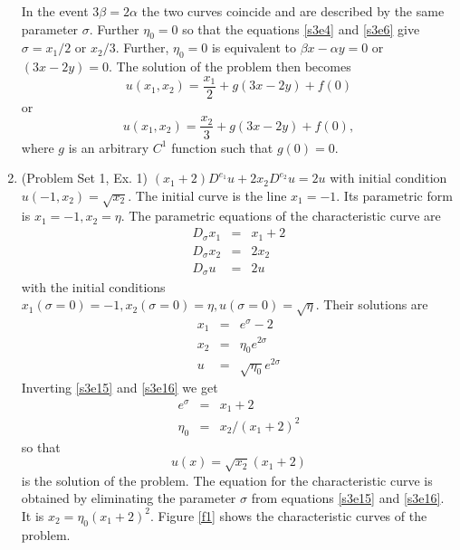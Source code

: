 \documentclass{article}
\theoremstyle{plain}
\numberwithin{thm}{section}
\theoremstyle{plain}
\numberwithin{prop}{section}
\theoremstyle{definition}
\numberwithin{defn}{section}
\theoremstyle{remark}
\numberwithin{equation}{section}
\begin{document}
\begin{enumerate}
In the event $3\beta = 2\alpha$ the two curves coincide and are described by the same parameter 
$\sigma$. Further $\eta_0 = 0$ so that the equations \eqref{s3e4} and \eqref{s3e6} give $\sigma = 
x_1/2$ or $x_2/3$. Further, $\eta_0 = 0$ is equivalent to $\beta x - \alpha y = 0$ or $(3x - 2y) = 0$.
The solution of the problem then becomes
\begin{equation}\label{s3e10}
u(x_1, x_2) = \frac{x_1}{2} + g(3x - 2y) + f(0)
\end{equation}
or
\begin{equation}\label{s3e11}
u(x_1, x_2) = \frac{x_2}{3} + g(3x - 2y) + f(0),
\end{equation}
where $g$ is an arbitrary $C^1$ function such that $g(0) = 0$.

\item (Problem Set 1, Ex. 1) $(x_1 + 2)D^{e_1}u + 2x_2D^{e_2}u = 2u$ with initial condition 
$u(-1, x_2) = \sqrt{x_2}$. The initial curve is the line $x_1 = -1$. Its parametric form is $x_1 = -1,
x_2 = \eta$. The parametric equations of the characteristic curve are
\begin{eqnarray}
D_\sigma x_1 &=& x_1 + 2 \label{s3e12} \\
D_\sigma x_2 &=& 2x_2 \label{s3e13} \\
D_\sigma u &=& 2u \label{s3e14}
\end{eqnarray}
with the initial conditions $x_1(\sigma = 0) = -1, x_2(\sigma = 0) = \eta, u(\sigma = 0) = 
\sqrt{\eta}$. Their solutions are
\begin{eqnarray}
x_1 &=& e^\sigma - 2 \label{s3e15} \\ 
x_2 &=& \eta_0 e^{2\sigma} \label{s3e16} \\
u &=& \sqrt{\eta_0}e^{2\sigma} \label{s3e17}
\end{eqnarray}
Inverting \eqref{s3e15} and \eqref{s3e16} we get 
\begin{eqnarray}
e^\sigma &=& x_1 + 2 \label{s3e18} \\
\eta_0 &=& x_2/(x_1 + 2)^2 \label{s3e19}
\end{eqnarray} 
so that
\begin{equation}\label{s3e20}
u(x) = \sqrt{x_2}(x_1 + 2)
\end{equation}
is the solution of the problem. The equation for the characteristic curve is obtained by eliminating
the parameter $\sigma$ from equations \eqref{s3e15} and \eqref{s3e16}. It is $x_2 = \eta_0(x_1 + 2)^2$.
Figure \ref{f1} shows the characteristic curves of the problem.
\begin{figure}

\end{figure}
\end{enumerate}
\end{document}
